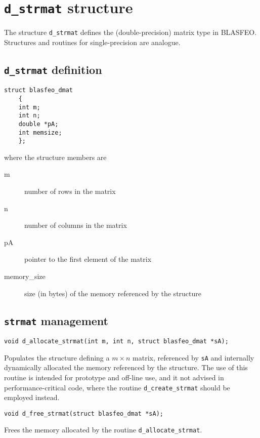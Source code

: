 \documentclass[a4paper]{report}
\begin{document}
\section{{\tt d\_strmat} structure}

The structure {\tt d\_strmat} defines the (double-precision) matrix type in BLASFEO.
Structures and routines for single-precision are analogue.



\subsection{{\tt d\_strmat} definition}

\begin{verbatim}
struct blasfeo_dmat 
    {
    int m;
    int n;
    double *pA;
    int memsize;
    };
\end{verbatim}
where the structure members are
\begin{description}
\item[m] number of rows in the matrix
\item[n] number of columns in the matrix
\item[pA] pointer to the first element of the matrix
\item[memory\_size] size (in bytes) of the memory referenced by the structure
\end{description}



\subsection{{\tt strmat} management}

\begin{verbatim}
void d_allocate_strmat(int m, int n, struct blasfeo_dmat *sA);
\end{verbatim}
Populates the structure defining a $m\times n$ matrix, referenced by {\tt sA} and internally dynamically allocated the memory referenced by the structure.
The use of this routine is intended for prototype and off-line use, and it not advised in performance-critical code, where the routine {\tt d\_create\_strmat} should be employed instead.

\begin{verbatim}
void d_free_strmat(struct blasfeo_dmat *sA);
\end{verbatim}
Frees the memory allocated by the routine {\tt d\_allocate\_strmat}.
\end{document}
